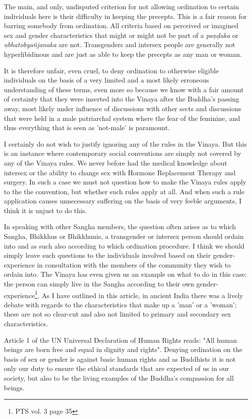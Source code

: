 The main, and only, undisputed criterion for not allowing ordination to certain individuals here is their difficulty in keeping the precepts. This is a fair reason for barring somebody from ordination. All criteria based on perceived or imagined sex and gender characteristics that might or might not be part of a {\em paṇḍaka} or {\em ubhatob­yañ­janaka} are not. Transgenders and intersex people are generally not hyperlibidinous and are just as able to keep the precepts as any man or woman. 

It is therefore unfair, even cruel, to deny ordination to otherwise eligible individuals on the basis of a very limited and a most likely erroneous understanding of these terms, even more so because we know with a fair amount of certainty that they were inserted into the Vinaya after the Buddha's passing away, most likely under influence of discussions with other sects and discussions that were held in a male patriarchal system where the fear of the feminine, and thus everything that is seen as 'not-male' is paramount. 

I certainly do not wish to justify ignoring any of the rules in the Vinaya. But this is an instance where contemporary social conventions are simply not covered by any of the Vinaya rules. We never before had the medical knowledge about intersex or the ability to change sex with Hormone Replacement Therapy and surgery. In such a case we must not question how to make the Vinaya rules apply to the the convention, but whether such rules apply at all. And when such a rule application causes unnecessary suffering on the basis of very feeble arguments, I think it is unjust to do this. 

In speaking with other Sangha members, the question often arises as to which Sangha, Bhikkhus or Bhikkhunis, a transgender or intersex person should ordain into and as such also according to which ordination procedure. I think we should simply leave such questions to the individuals involved based on their gender-experience in consultation with the members of the community they wish to ordain into. The Vinaya has even given us an example on what to do in this case: the person can simply live in the Sangha according to their own gender-experience\footnote{PTS vol. 3 page 35}. As I have outlined in this article, in ancient India there was a lively debate with regards to the characteristics that make up a 'man' or a 'woman'; these are not so clear-cut and also not limited to primary and secondary sex characteristics. 

Article 1 of the UN Universal Declaration of Human Rights reads: "All human beings are born free and equal in dignity and rights". Denying ordination on the basis of sex or gender is against basic human rights and as Buddhists it is not only our duty to ensure the ethical standards that are expected of us in our society, but also to be the living examples of the Buddha's compassion for all beings.

